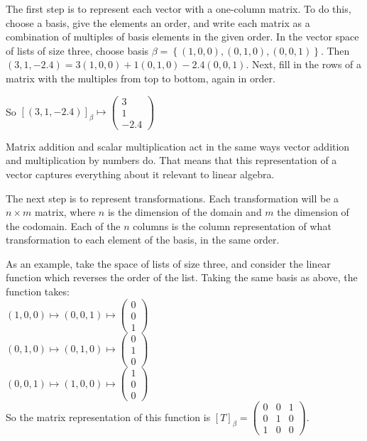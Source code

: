\documentclass{article}
\begin{document}
            The first step is to represent each vector with a one-column matrix. To do this, choose a basis, give the elements an order,  and write each matrix as a combination of multiples of basis elements in the given order. In the vector space of lists of size three, choose basis $\beta = \left\{(1,0,0),(0,1,0),(0,0,1)\right\}$. Then $(3,1,-2.4) = 3(1,0,0) + 1(0,1,0) -2.4(0,0,1)$. Next, fill in the rows of a matrix with the multiples from top to bottom, again in order. 
            
            So $[(3,1,-2.4)]_\beta \mapsto \begin{pmatrix} 3\\1\\-2.4\end{pmatrix}$

            Matrix addition and scalar multiplication act in the same ways vector addition and multiplication by numbers do. That means that this representation of a vector captures everything about it relevant to linear algebra.

            The next step is to represent transformations. Each transformation will be a $n \times m$ matrix, where $n$ is the dimension of the domain and $m$ the dimension of the codomain. Each of the $n$ columns is the column representation of what transformation to each element of the basis, in the same order. 

            As an example, take the space of lists of size three, and consider the linear function which reverses the order of the list. Taking the same basis as above, the function takes: \\
            $ (1,0,0) \mapsto  (0,0,1) \mapsto \begin{pmatrix}0\\0\\1\end{pmatrix}$\\
            $(0,1,0)\mapsto (0,1,0) \mapsto \begin{pmatrix}0\\1\\0\end{pmatrix}$ \\
            $(0,0,1)\mapsto(1,0,0) \mapsto \begin{pmatrix}1\\0\\0\end{pmatrix}$\\
            So the matrix representation of this function is $[T]_\beta = \begin{pmatrix}0 & 0 & 1 \\ 0 & 1 & 0 \\ 1 & 0 & 0 \end{pmatrix}$. 
            
\end{document}
